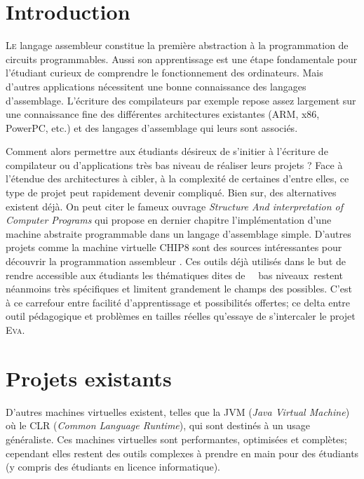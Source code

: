 \documentclass[11pt,twoside]{article}
\makeatletter
\providecommand{\og}{\leavevmode\flqq~}%
\providecommand{\fg}{\ifdim\lastskip>\z@\unskip\fi~\frqq}%
\newcommand{\noun}[1]{\textsc{#1}}
\makeatother
\begin{document}
\hspace{0pt}
\vfill

\section{Introduction}

\lettrine[lines=3,slope=.3em]%
{L}{e} langage assembleur constitue la première abstraction à la programmation
de circuits programmables. Aussi son apprentissage est une étape fondamentale pour l'étudiant curieux de comprendre le fonctionnement des ordinateurs. Mais d'autres applications nécessitent une bonne connaissance des langages d'assemblage. L'écriture des compilateurs par exemple repose assez largement sur une connaissance fine des différentes architectures existantes (ARM, x86, PowerPC, etc.) et des langages d'assemblage qui leurs sont associés.

Comment alors permettre aux étudiants désireux de s'initier à l'écriture de compilateur ou d'applications très bas niveau de réaliser leurs projets ? Face à l'étendue des architectures à cibler, à la complexité de certaines d’entre elles, ce type de projet peut rapidement devenir compliqué. Bien sur, des alternatives existent déjà. On peut citer le fameux ouvrage \textit{Structure And interpretation of Computer Programs} \cite{SICP} qui propose en dernier chapitre l'implémentation d'une machine abstraite programmable dans un langage d'assemblage simple. D'autres projets comme la machine virtuelle CHIP8 sont des sources intéressantes pour découvrir la programmation assembleur \cite{CHIP8}. Ces outils déjà utilisés dans le but de rendre accessible aux étudiants les thématiques dites de \og~bas niveaux\fg restent néanmoins très spécifiques et limitent grandement le champs des possibles. C'est à ce carrefour entre facilité d'apprentissage et possibilités offertes; ce delta entre outil pédagogique et problèmes en tailles réelles qu'essaye de s'intercaler le projet \noun{Eva}. \\

\section{Projets existants}

D'autres machines virtuelles existent, telles que la JVM (\emph{Java Virtual Machine}) où le CLR (\emph{Common Language Runtime}), qui sont destinés à un usage généraliste. Ces machines virtuelles sont performantes, optimisées et complètes; cependant elles restent des outils complexes à prendre en main pour des étudiants (y compris des étudiants en licence informatique).\\
\end{document}

